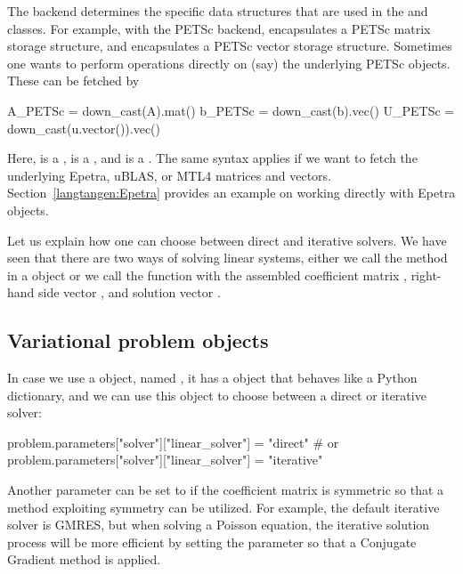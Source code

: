 The backend determines the specific data structures that are
used in the  and  classes. For example,
with the PETSc backend,  encapsulates a
PETSc matrix storage structure, and
 encapsulates a PETSc vector storage structure.
Sometimes one wants to perform operations directly on (say) the
underlying PETSc objects. These can be fetched by
\begin{python}
A_PETSc = down_cast(A).mat()
b_PETSc = down_cast(b).vec()
U_PETSc = down_cast(u.vector()).vec()
\end{python}
Here,  is a ,  is a ,
and  is a .
The same syntax applies if we want to fetch
the underlying Epetra, uBLAS, or MTL4 matrices and vectors.
Section~\ref{langtangen:Epetra} provides an example on working directly with
Epetra objects.


Let us explain how one can choose between direct and iterative solvers.
We have seen that there
are two ways of solving linear systems, either we call the 
method in a  object or we call the 
function with the assembled coefficient matrix ,
right-hand side vector , and
solution vector .

\subsection{Variational problem objects}

In case we use a  object, named ,
it has a  object that behaves like a Python dictionary,
and we can use this object to choose between a direct or iterative
solver:
\begin{python}
problem.parameters["solver"]["linear_solver"] = "direct"
# or
problem.parameters["solver"]["linear_solver"] = "iterative"
\end{python}
Another parameter  can be set to  if the
coefficient matrix is symmetric so that a method exploiting symmetry
can be utilized.  For example, the default iterative solver is GMRES,
but when solving a Poisson equation, the iterative solution process
will be more efficient by setting the  parameter so
that a Conjugate Gradient method is applied.

